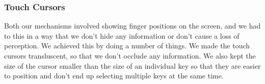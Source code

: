 \subsubsection{Touch Cursors}

Both our mechanisms involved showing finger positions on the screen,
and we had to this in a way that we don't hide any information or
don't cause a loss of perception. We achieved this by doing a number
of things. We made the touch cursors transluscent, so that we don't
occlude any information. We also kept the size of the cursor smaller
than the size of an individual key so that they are easier to position
and don't end up selecting multiple keys at the same time.
